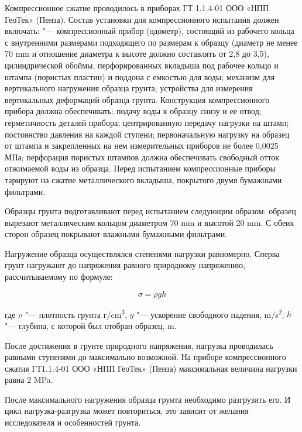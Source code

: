 Компрессионное сжатие проводилось в приборах ГТ 1.1.4-01 ООО «НПП ГеоТек» (Пенза).
Состав установки для компрессионного испытания должен включать: 
"--- компрессионный прибор (одометр), состоящий из рабочего кольца с
внутренними размерами подходящего по размерам к образцу (диаметр не менее 70 \si{\milli\meter} 
и отношение диаметра к высоте должно составлять от 2,8 до 3,5), цилиндрической обоймы,
перфорированных вкладыша под рабочее кольцо и штампа (пористых пластин) и поддона с емкостью для воды; 
механизм для вертикального нагружения образца грунта; 
устройства для измерения вертикальных деформаций образца грунта.
Конструкция компрессионного прибора должна обеспечивать: подачу воды к образцу снизу и ее отвод; 
герметичность деталей прибора; центрированную передачу нагрузки на штамп; постоянство давления 
на каждой ступени; первоначальную нагрузку на образец от штампа и закрепленных на нем
измерительных приборов не более 0,0025 МПа; перфорация пористых штампов должна 
обеспечивать свободный отток отжимаемой воды из образца.
Перед испытанием компрессионные приборы тарируют на сжатие металлического 
вкладыша, покрытого двумя бумажными фильтрами.

Образцы грунта подготавливают перед испытанием следующим образом:
образец вырезают металлическим кольцом диаметром 70 \si{\milli\meter} 
и высотой 20 \si{\milli\meter}. С обеих сторон образец покрывают 
влажными бумажными фильтрами. 

Нагружение образца осуществлялся степенями нагрузки равномерно. 
Сперва грунт нагружают до напряжения равного природному 
напряжению, рассчитываемому по формуле: 

\[
   \sigma = \rho g h
\]

где $\rho$ "--- плотность грунта г/\si{\centi\meter^3},
$g$ "--- ускорение свободного падения, \si{\meter}/\si{\second^2},
$h$ "--- глубина, с которой был отобран образец, \si{\meter}.

После достижения в грунте природного напряжения, нагрузка 
проводилась равными ступенями до максимально возможной. На приборе 
компрессионного сжатия ГТ1.1.4-01 ООО «НПП ГеоТек» (Пенза) максимальная 
величина нагрузки равна 2 \si{\mega\pascal}.

После максимального нагружения образца грунта необходимо разгрузить его. 
И цикл нагрузка-разгрузка может повториться, это зависит от желания исследователя и особенностей грунта.


